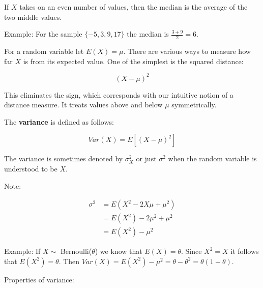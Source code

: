\documentclass[11pt]{article}
\begin{document}
\vspace{2mm}

If $X$ takes on an even number of values, then the median is the average of the two middle values.

\vspace{2mm}

Example: For the sample $\{-5, 3, 9, 17\}$ the median is $\frac{3+9}{2} = 6$.

\vspace{2mm}

For a random variable let $E(X) = \mu$. There are various ways to measure how far $X$ is from its expected value.
One of the simplest is the squared distance:

\begin{equation*}
(X - \mu)^{2}
\end{equation*} 

This eliminates the sign, which corresponds with our intuitive notion of a distance measure. It treats values 
above and below $\mu$ symmetrically.

\vspace{2mm}

The \textbf{variance} is defined as follows:

\begin{equation*}
Var(X) = E[(X - \mu)^{2}]
\end{equation*}

The variance is sometimes denoted by $\sigma_{X}^{2}$ or just $\sigma^{2}$ when the random variable is understood
to be $X$.

\vspace{2mm}

Note: 

\begin{align*}
\sigma^{2} &= E(X^{2} - 2X\mu + \mu^{2}) \\
            &= E(X^{2}) - 2\mu^{2} + \mu^{2} \\
            &= E(X^{2}) - \mu^{2}
\end{align*}

\vspace{2mm}

Example: If $X \sim$ Bernoulli($\theta$) we know that $E(X) = \theta$. Since $X^{2} = X$ it follows that
$E(X^{2}) = \theta$. Then $Var(X) = E(X^{2}) - \mu^{2} = \theta - \theta^{2} = \theta(1 - \theta)$.

\vspace{2mm}

Properties of variance:
\end{document}
